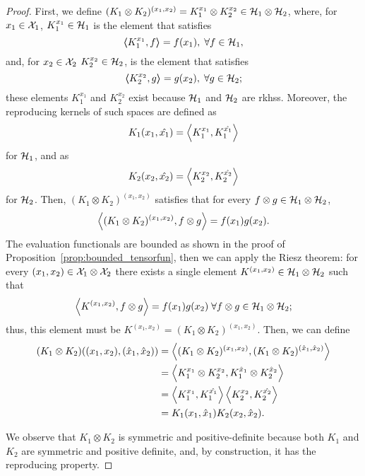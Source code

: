 \begin{proof}
    First, we define $(K_1 \otimes K_2)^{(x_1 , x_2)} =  K_1^{x_1} \otimes K_2^{x_2}  \in \mathcal{H}_1 \otimes \mathcal{H}_2$,
    where, for $x_1 \in \mathcal{X}_1$,  $K_1^{x_1} \in \mathcal{H}_1$ is the element that satisfies
    \begin{equation}\nonumber
        \bm{\left\langle} K_1^{x_1}, f \bm{\right\rangle} = f(x_1) , \; \forall f \in \mathcal{H}_1 ,
    \end{equation}
    and, for $x_2 \in \mathcal{X}_2$  $K_2^{x_2} \in \mathcal{H}_2$, is the element that satisfies
    \begin{equation}\nonumber
        \bm{\left\langle} K_2^{x_2}, g \bm{\right\rangle} = g(x_2) , \; \forall g \in \mathcal{H}_2  ;
    \end{equation}
    these elements $K_1^{x_1}$ and $K_2^{x_2}$ exist because $\mathcal{H}_1$ and $\mathcal{H}_2$ are \acrshort{rkhss}.
    Moreover, the reproducing kernels of such spaces are defined as
    $$ K_1(x_1, \hat{x_1}) = \bm{\left\langle} K_1^{x_1}, K_1^{\hat{x_1}} \bm{\right\rangle} $$
    for $\mathcal{H}_1$, and as 
    $$ K_2(x_2, \hat{x_2}) = \bm{\left\langle} K_2^{x_2}, K_2^{\hat{x_2}} \bm{\right\rangle} $$
    for $\mathcal{H}_2$.
    Then, $(K_1 \otimes K_2)^{(x_1 , x_2)}$ satisfies that for every $f \otimes g \in \mathcal{H}_1 \otimes \mathcal{H}_2$,
    \begin{equation}\nonumber
        \bm{\left\langle} (K_1 \otimes K_2)^{(x_1 , x_2)}, f \otimes g \bm{\right\rangle} = f(x_1) g(x_2) .
    \end{equation}
    The evaluation functionals are bounded as shown in the proof of Proposition~\ref{prop:bounded_tensorfun}, then we can apply the Riesz theorem: for every $(x_1 , x_2) \in \mathcal{X}_1 \otimes \mathcal{X}_2$ there exists a single element $K^{(x_1 , x_2)} \in \mathcal{H}_1 \otimes \mathcal{H}_2$ such that
    \begin{equation}
        \nonumber
        \bm{\left\langle} K^{(x_1 , x_2)}, f \otimes g \bm{\right\rangle}  = f(x_1) g(x_2)\;  \forall f \otimes g \in \mathcal{H}_1 \otimes \mathcal{H}_2 ;
    \end{equation}
    thus, this element must be $K^{(x_1 , x_2)} = (K_1 \otimes K_2)^{(x_1 , x_2)}$.
    Then, we can define
    \begin{align*}
        (K_1 \otimes K_2)((x_1 , x_2), (\hat{x}_1 , \hat{x}_2)) & = \bm{\left\langle} (K_1 \otimes K_2)^{(x_1 , x_2)}, (K_1 \otimes K_2)^{(\hat{x}_1 , \hat{x}_2)} \bm{\right\rangle} \\
                                                                & = \bm{\left\langle} K_1^{x_1} \otimes K_2^{x_2}, K_1^{\hat{x}_1} \otimes K_2^{\hat{x}_2} \bm{\right\rangle}         \\
                                                                & = \bm{\left\langle} K_1^{x_1}, K_1^{\hat{x_1}} \bm{\right\rangle} \bm{\left\langle} K_2^{x_2}, K_2^{\hat{x_2}} \bm{\right\rangle}                 \\
                                                                & = K_1(x_1, \hat{x}_1) K_2(x_2, \hat{x}_2) .
    \end{align*}


    We observe that $K_1 \otimes K_2$ is symmetric and positive-definite because both $K_1$ and $K_2$ are symmetric and positive definite, %
    and, by construction, it has the reproducing property.
\end{proof}
